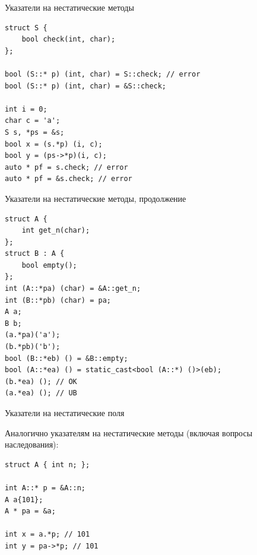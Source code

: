 \documentclass[unknownkeysallowed,xcolor=table]{beamer}
\begin{document}
\begin{frame}[fragile]{Указатели на нестатические методы}

\begin{lstlisting}
struct S {
    bool check(int, char);
};

bool (S::* p) (int, char) = S::check; // error
bool (S::* p) (int, char) = &S::check;

int i = 0;
char c = 'a';
S s, *ps = &s;
bool x = (s.*p) (i, c);
bool y = (ps->*p)(i, c);
auto * pf = s.check; // error
auto * pf = &s.check; // error
\end{lstlisting}

\end{frame}

\begin{frame}[fragile]{Указатели на нестатические методы, продолжение}

\begin{lstlisting}
struct A {
    int get_n(char);
};
struct B : A {
    bool empty();
};
int (A::*pa) (char) = &A::get_n;
int (B::*pb) (char) = pa;
A a;
B b;
(a.*pa)('a');
(b.*pb)('b');
bool (B::*eb) () = &B::empty;
bool (A::*ea) () = static_cast<bool (A::*) ()>(eb);
(b.*ea) (); // OK
(a.*ea) (); // UB
\end{lstlisting}

\end{frame}

\begin{frame}[fragile]{Указатели на нестатические поля}

Аналогично указателям на нестатические методы (включая вопросы наследования):

\vspace{0.7em}

\begin{lstlisting}
struct A { int n; };

int A::* p = &A::n;
A a{101};
A * pa = &a;

int x = a.*p; // 101
int y = pa->*p; // 101
\end{lstlisting}

\end{frame}
\end{document}
